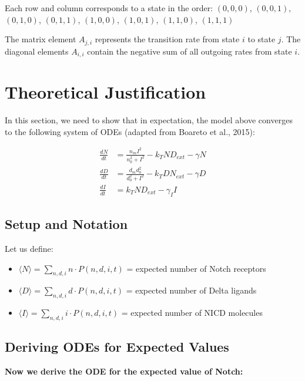 \documentclass{article}
\begin{document}
\begin{flushleft}
Each row and column corresponds to a state in the order:
$(0,0,0)$, $(0,0,1)$, $(0,1,0)$, $(0,1,1)$, $(1,0,0)$, $(1,0,1)$, $(1,1,0)$, $(1,1,1)$

The matrix element $A_{j,i}$ represents the transition rate from state $i$ to state $j$. The diagonal elements $A_{i,i}$ contain the negative sum of all outgoing rates from state $i$.


\section{Theoretical Justification}
\label{sec:theoretical-justification}


In this section, we need to show that in expectation, the model above converges to the following system of ODEs (adapted from Boareto et al., 2015):

$$
\begin{aligned}
  \frac{dN}{dt} &= \frac{n_{m}I^2}{n_{0}^2 + I^2} - k_{T}ND_{ext} - \gamma N \\[5pt]
  \frac{dD}{dt} &= \frac{d_{m}d_{0}^2}{d_{0}^2 + I^2} - k_{T}DN_{ext} - \gamma D \\[5pt]
  \frac{dI}{dt} &= k_{T}ND_{ext} - \gamma_{I}I
\end{aligned}
$$

\subsection*{Setup and Notation}

Let us define:
\begin{itemize}
  \item $\langle N \rangle = \sum_{n,d,i} n \cdot P(n,d,i,t)$ = expected number of Notch receptors
  \item $\langle D \rangle = \sum_{n,d,i} d \cdot P(n,d,i,t)$ = expected number of Delta ligands
  \item $\langle I \rangle = \sum_{n,d,i} i \cdot P(n,d,i,t)$ = expected number of NICD molecules
\end{itemize}

\subsection*{Deriving ODEs for Expected Values}

\textbf{Now we derive the ODE for the expected value of Notch:}


\end{flushleft}
\end{document}
